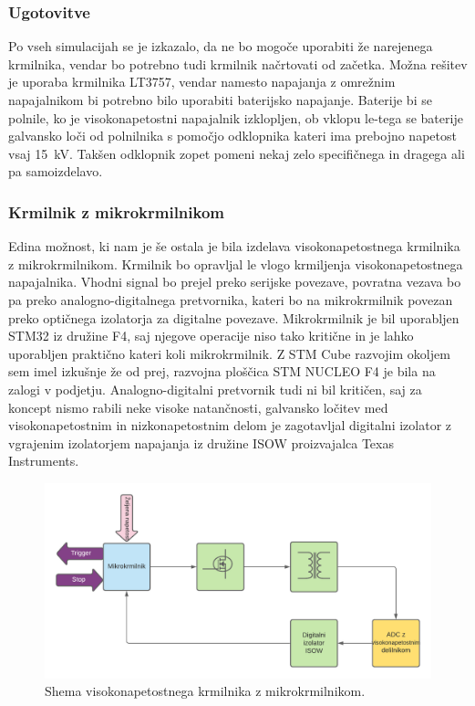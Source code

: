 \documentclass[a4paper,twoside,openright,12pt,Slovene]{book}
\begin{document}
    \subsubsection{Ugotovitve} \label{Ugotovitve glede komercialnih krmilnkov}
Po vseh simulacijah se je izkazalo, da ne bo mogoče uporabiti že narejenega krmilnika, vendar bo potrebno tudi krmilnik načrtovati od začetka. Možna rešitev je uporaba krmilnika LT3757, vendar namesto napajanja z omrežnim napajalnikom bi potrebno bilo uporabiti baterijsko napajanje. Baterije bi se polnile, ko je visokonapetostni napajalnik izklopljen, ob vklopu le-tega se baterije galvansko loči od polnilnika s pomočjo odklopnika kateri ima prebojno napetost vsaj \SI{15}{\kilo\volt}. Takšen odklopnik zopet pomeni nekaj zelo specifičnega in dragega ali pa samoizdelavo. 

	\subsubsection{Krmilnik z mikrokrmilnikom} \label{KrmilnikzUc}
Edina možnost, ki nam je še ostala je bila izdelava visokonapetostnega krmilnika z mikrokrmilnikom. Krmilnik bo opravljal le vlogo krmiljenja visokonapetostnega napajalnika. Vhodni signal bo prejel preko serijske povezave, povratna vezava bo pa preko analogno-digitalnega pretvornika, kateri bo na mikrokrmilnik povezan preko optičnega izolatorja za digitalne povezave.  Mikrokrmilnik je bil uporabljen STM32 iz družine F4, saj njegove operacije niso tako kritične in je lahko uporabljen praktično kateri koli mikrokrmilnik. Z STM Cube razvojim okoljem sem imel izkušnje že od prej, razvojna ploščica STM NUCLEO F4 je bila na zalogi v podjetju. Analogno-digitalni pretvornik tudi ni bil kritičen, saj za koncept nismo rabili neke visoke natančnosti, galvansko ločitev med visokonapetostnim in nizkonapetostnim delom je zagotavljal digitalni izolator z vgrajenim izolatorjem napajanja iz družine ISOW proizvajalca Texas Instruments. 

	\begin{figure}[H]
    \centering
    \includegraphics[width=1\columnwidth]{Sheme/KrmilnikzuCElShema.pdf}
    \caption{\label{KrmilnikzuCElShema} Shema visokonapetostnega krmilnika z mikrokrmilnikom.}
	\end{figure}
\end{document}
